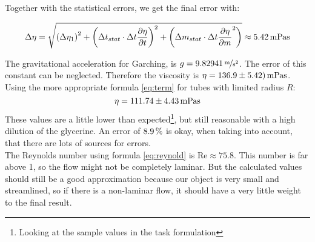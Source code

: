 Together with the statistical errors, we get the final error with:

\begin{equation}
\Delta \eta = \sqrt{\left(\Delta \eta_1\right)^2 + \left(
\Delta t_{stat} \cdot \Delta t\frac{\partial \eta}{\partial t}
\right)^2 +
\left(
\Delta m_{stat} \cdot \Delta t\frac{\partial \eta}{\partial m}^2
\right)}
\approx \unit[5.42]{mPa s}
\end{equation}

The gravitational acceleration for Garching, is $g = \unitfrac[9.82941]{m}{s^2}$. The error of this constant can be neglected. Therefore the viscosity is $\eta = \unit[136.9 \pm 5.42)]{mPa s} $.\\
Using the more appropriate formula \ref{eq:term} for tubes with limited radius $R$:
\begin{equation}
\eta = \unit[111.74 \pm 4.43]{mPa s}
\end{equation}
These values are a little lower than expected\footnote{Looking at the sample values in the task formulation}, but still reasonable with a high dilution of the glycerine. An error of $\unit[8.9]{\%}$ is okay, when taking into account, that there are lots of sources for errors.\\
The Reynolds number using formula \ref{eq:reynold} is $\text{Re} \approx 75.8$. This number is far above 1, so the flow might not be completely laminar. But the calculated values should still be a good approximation because our object is very small and streamlined, so if there is a non-laminar flow, it should have a very little weight to the final result.





